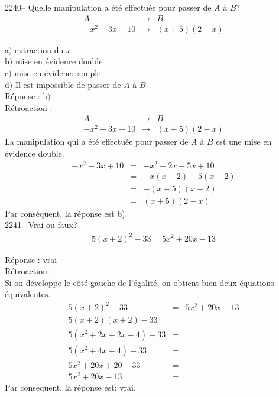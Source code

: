 \documentclass[letterpaper, 12pt]{article}
\begin{document}
2240-- Quelle manipulation a \'et\'e effectu\'ee pour passer de $A$ \`a $B$?
\begin{eqnarray*}
 A &\rightarrow& B\\
-x^{2}-3x+10 &\rightarrow& (x+5)(2-x)
\end{eqnarray*}

a$)$ extraction du $x$\\
b$)$ mise en \'evidence double\\
c$)$ mise en \'evidence simple \\
d$)$ Il est impossible de passer de $A$ \`a $B$\\

R\'eponse : b$)$\\

R\'etroaction :
\begin{eqnarray*}
 A &\rightarrow& B\\
-x^{2}-3x+10 &\rightarrow& (x+5)(2-x)
\end{eqnarray*}
La manipulation qui a \'et\'e effectu\'ee pour passer de $A$ \`a $B$ est une mise en \'evidence double.
\begin{eqnarray*}
 -x^{2}-3x+10 &=& -x^{2}+2x-5x+10\\
&=& -x(x-2)-5(x-2)\\
&=& -(x+5)(x-2)\\
&=& (x+5)(2-x)
\end{eqnarray*}
Par cons\'equent, la r\'eponse est b).\\

2241-- Vrai ou faux?
\begin{eqnarray*}
 5(x+2)^{2}-33 = 5x^{2}+20x-13
\end{eqnarray*}

R\'eponse : vrai\\

R\'etroaction :\\
Si on d\'eveloppe le c\^ot\'e gauche de l'\'egalit\'e, on obtient bien deux \'equations \'equivalentes.
\begin{eqnarray*}
 5(x+2)^{2}-33 &=& 5x^{2}+20x-13\\
 5(x+2)(x+2)-33 &=& \\
 5(x^{2}+2x+2x+4)-33 &=& \\
 5(x^{2}+4x+4)-33 &=& \\
 5x^{2}+20x+20-33 &=& \\
 5x^{2}+20x-13 &=&
\end{eqnarray*}
Par cons\'equent, la r\'eponse est: vrai.\\
\end{document}
